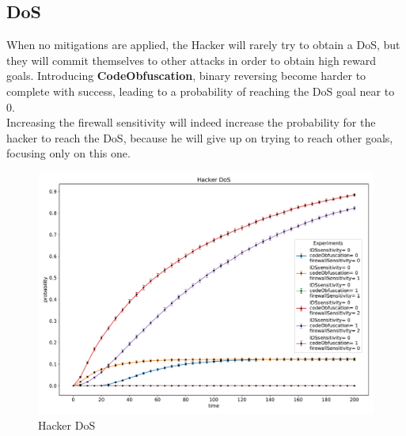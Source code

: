 \subsection*{DoS}
When no mitigations are applied, the Hacker will rarely try to obtain a DoS, but they will commit themselves
to other attacks in order to obtain high reward goals. Introducing \textbf{CodeObfuscation}, binary reversing
become harder to complete with success, leading to a probability of reaching the DoS goal near to 0.\\
Increasing the firewall sensitivity will indeed increase the probability for the hacker to reach the DoS,
because he will give up on trying to reach other goals, focusing only on this one.
\begin{figure}[H]
    \begin{center}
        \includegraphics[scale=0.45]{img/Hacker_DoS.pdf}
    \end{center}
    \caption{Hacker DoS}
    \label{fig:Hacker_DoS}
    \vspace*{-0.8cm}
\end{figure}
\newpage
